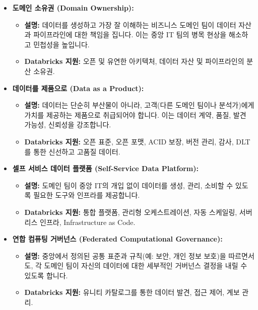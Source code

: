 \documentclass[11pt,a4paper]{article}
\theoremstyle{definition}
\begin{document}
\begin{tcolorbox}[title=\textbf{데이터 메시의 4가지 핵심 원칙}, colback=orange!5!white, colframe=orange!75!black, sharp corners, boxrule=0.8pt]
\begin{itemize}
    \item \textbf{도메인 소유권 (Domain Ownership):}
    \begin{itemize}
        \item \textbf{설명:} 데이터를 생성하고 가장 잘 이해하는 비즈니스 도메인 팀이 데이터 자산과 파이프라인에 대한 책임을 집니다. 이는 중앙 IT 팀의 병목 현상을 해소하고 민첩성을 높입니다.
        \item \textbf{Databricks 지원:} 오픈 및 유연한 아키텍처, 데이터 자산 및 파이프라인의 분산 소유권.
    \end{itemize}
    \item \textbf{데이터를 제품으로 (Data as a Product):}
    \begin{itemize}
        \item \textbf{설명:} 데이터는 단순히 부산물이 아니라, 고객(다른 도메인 팀이나 분석가)에게 가치를 제공하는 제품으로 취급되어야 합니다. 이는 데이터 계약, 품질, 발견 가능성, 신뢰성을 강조합니다.
        \item \textbf{Databricks 지원:} 오픈 표준, 오픈 포맷, ACID 보장, 버전 관리, 감사, DLT를 통한 신선하고 고품질 데이터.
    \end{itemize}
    \item \textbf{셀프 서비스 데이터 플랫폼 (Self-Service Data Platform):}
    \begin{itemize}
        \item \textbf{설명:} 도메인 팀이 중앙 IT의 개입 없이 데이터를 생성, 관리, 소비할 수 있도록 필요한 도구와 인프라를 제공합니다.
        \item \textbf{Databricks 지원:} 통합 플랫폼, 관리형 오케스트레이션, 자동 스케일링, 서버리스 인프라, Infrastructure as Code.
    \end{itemize}
    \item \textbf{연합 컴퓨팅 거버넌스 (Federated Computational Governance):}
    \begin{itemize}
        \item \textbf{설명:} 중앙에서 정의된 공통 표준과 규칙(예: 보안, 개인 정보 보호)을 따르면서도, 각 도메인 팀이 자신의 데이터에 대한 세부적인 거버넌스 결정을 내릴 수 있도록 합니다.
        \item \textbf{Databricks 지원:} 유니티 카탈로그를 통한 데이터 발견, 접근 제어, 계보 관리.
    \end{itemize}
\end{itemize}
\end{tcolorbox}
\end{document}
